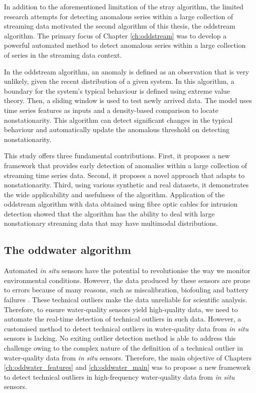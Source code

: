 \documentclass{monashthesis}
\theoremstyle{definition}
\theoremstyle{definition}
\theoremstyle{definition}
\theoremstyle{remark}
\begin{document}
In addition to the aforementioned limitation of the stray algorithm, the limited research attempts for detecting anomalous series within a large collection of streaming data motivated the second algorithm of this thesis, the oddstream algorithm. The primary focus of Chapter \ref{ch:oddstream} was to develop a powerful automated method to detect anomalous series within a large collection of series in the streaming data context.

In the oddstream algorithm, an anomaly is defined as an observation that is very unlikely, given the recent distribution of a given system. In this algorithm, a boundary for the system's typical behaviour is defined using extreme value theory. Then, a sliding window is used to test newly arrived data. The model uses time series features as inputs and a density-based comparison to locate nonstationarity. This algorithm can detect significant changes in the typical behaviour and automatically update the anomalous threshold on detecting nonstationarity.

This study offers three fundamental contributions. First, it proposes a new framework that provides early detection of anomalies within a large collection of streaming time series data. Second, it proposes a novel approach that adapts to nonstationarity. Third, using various synthetic and real datasets, it demonstrates the wide applicability and usefulness of the algorithm. Application of the oddstream algorithm with data obtained using fibre optic cables for intrusion detection showed that the algorithm has the ability to deal with large nonstationary streaming data that may have multimodal distributions.

\hypertarget{the-oddwater-algorithm}{%
\subsection{The oddwater algorithm}\label{the-oddwater-algorithm}}

Automated \emph{in situ} sensors have the potential to revolutionise the way we monitor environmental conditions. However, the data produced by these sensors are prone to errors because of many reasons, such as miscalibration, biofouling and battery failures \autocite{horsburgh2015open}. These technical outliers make the data unreliable for scientific analysis. Therefore, to ensure water-quality sensors yield high-quality data, we need to automate the real-time detection of technical outliers in such data. However, a customised method to detect technical outliers in water-quality data from \emph{in situ} sensors is lacking. No exiting outlier detection method is able to address this challenge owing to the complex nature of the definition of a technical outlier in water-quality data from \emph{in situ} sensors. Therefore, the main objective of Chapters \ref{ch:oddwater_features} and
\ref{ch:oddwater_main} was to propose a new framework to detect technical outliers in high-frequency water-quality data from \emph{in situ} sensors.
\end{document}

